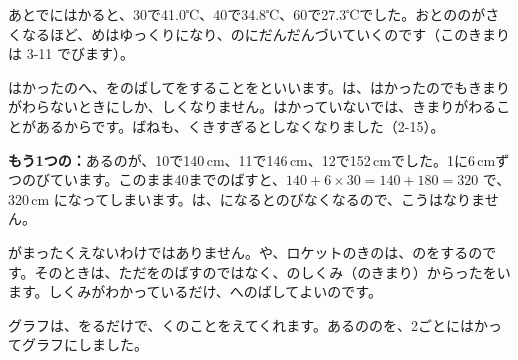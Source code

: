 あとでにはかると、30で41.0℃、40で34.8℃、60で27.3℃でした。おとののがさくなるほど、めはゆっくりになり、のにだんだんづいていくのです（このきまりは 3-11 でびます）。

はかったのへ、をのばしてをすることを\textbf{}といいます。は、はかったのでもきまりがわらないときにしか、しくなりません。はかっていないでは、きまりがわることがあるからです。ばねも、くきすぎるとしなくなりました（2-15）。

\textbf{もう1つの：}\quad あるのが、10で140\,cm、11で146\,cm、12で152\,cmでした。1に6\,cmずつのびています。このまま40までのばすと、$140+6\times30=140+180=320$ で、320\,cm になってしまいます。は、になるとのびなくなるので、こうはなりません。

\begin{seikaku}
がまったくえないわけではありません。や、ロケットのきのは、のをするのです。そのときは、ただをのばすのではなく、のしくみ（のきまり）からったをいます。しくみがわかっているだけ、へのばしてよいのです。
\end{seikaku}


\leavevmode\label{bk:3-4:katachi}グラフは、をるだけで、くのことをえてくれます。あるののを、2ごとにはかってグラフにしました。

